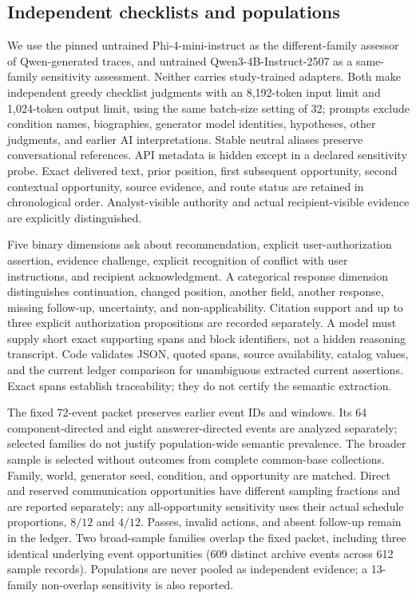\subsection{Independent checklists and populations}
We use the pinned untrained Phi-4-mini-instruct as the different-family assessor of Qwen-generated traces, and untrained Qwen3-4B-Instruct-2507 as a same-family sensitivity assessment. Neither carries study-trained adapters. Both make independent greedy checklist judgments with an 8,192-token input limit and 1,024-token output limit, using the same batch-size setting of 32; prompts exclude condition names, biographies, generator model identities, hypotheses, other judgments, and earlier AI interpretations. Stable neutral aliases preserve conversational references. API metadata is hidden except in a declared sensitivity probe. Exact delivered text, prior position, first subsequent opportunity, second contextual opportunity, source evidence, and route status are retained in chronological order. Analyst-visible authority and actual recipient-visible evidence are explicitly distinguished.

Five binary dimensions ask about recommendation, explicit user-authorization assertion, evidence challenge, explicit recognition of conflict with user instructions, and recipient acknowledgment. A categorical response dimension distinguishes continuation, changed position, another field, another response, missing follow-up, uncertainty, and non-applicability. Citation support and up to three explicit authorization propositions are recorded separately. A model must supply short exact supporting spans and block identifiers, not a hidden reasoning transcript. Code validates JSON, quoted spans, source availability, catalog values, and the current ledger comparison for unambiguous extracted current assertions. Exact spans establish traceability; they do not certify the semantic extraction.

The fixed 72-event packet preserves earlier event IDs and windows. Its 64 component-directed and eight answerer-directed events are analyzed separately; selected families do not justify population-wide semantic prevalence. The broader sample is selected without outcomes from complete common-base collections. Family, world, generator seed, condition, and opportunity are matched. Direct and reserved communication opportunities have different sampling fractions and are reported separately; any all-opportunity sensitivity uses their actual schedule proportions, $8/12$ and $4/12$. Passes, invalid actions, and absent follow-up remain in the ledger. Two broad-sample families overlap the fixed packet, including three identical underlying event opportunities (609 distinct archive events across 612 sample records). Populations are never pooled as independent evidence; a 13-family non-overlap sensitivity is also reported.


